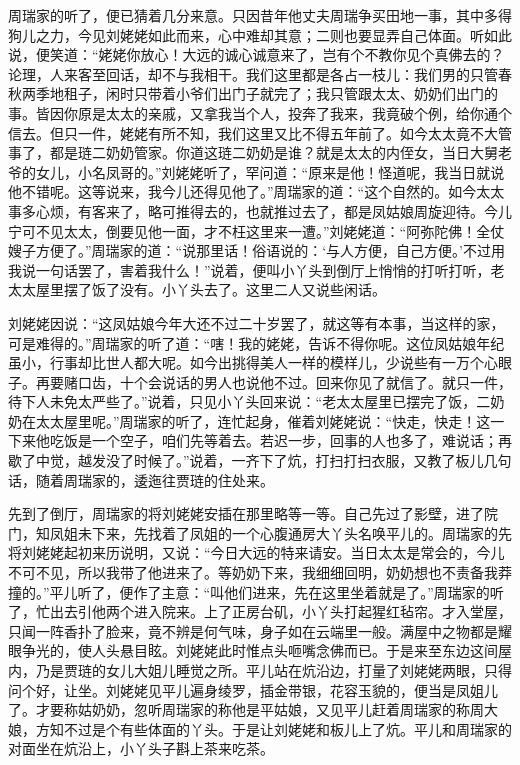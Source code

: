 \documentclass[12pt,oneside]{book}
\begin{document}
周瑞家的听了，便已猜着几分来意。只因昔年他丈夫周瑞争买田地一事，其中多得狗儿之力，今见刘姥姥如此而来，心中难却其意；二则也要显弄自己体面。听如此说，便笑道：“姥姥你放心！大远的诚心诚意来了，岂有个不教你见个真佛去的？论理，人来客至回话，却不与我相干。我们这里都是各占一枝儿：我们男的只管春秋两季地租子，闲时只带着小爷们出门子就完了；我只管跟太太、奶奶们出门的事。皆因你原是太太的亲戚，又拿我当个人，投奔了我来，我竟破个例，给你通个信去。但只一件，姥姥有所不知，我们这里又比不得五年前了。如今太太竟不大管事了，都是琏二奶奶管家。你道这琏二奶奶是谁？就是太太的内侄女，当日大舅老爷的女儿，小名凤哥的。”刘姥姥听了，罕问道：“原来是他！怪道呢，我当日就说他不错呢。这等说来，我今儿还得见他了。”周瑞家的道：“这个自然的。如今太太事多心烦，有客来了，略可推得去的，也就推过去了，都是凤姑娘周旋迎待。今儿宁可不见太太，倒要见他一面，才不枉这里来一遭。”刘姥姥道：“阿弥陀佛！全仗嫂子方便了。”周瑞家的道：“说那里话！俗语说的：‘与人方便，自己方便。’不过用我说一句话罢了，害着我什么！”说着，便叫小丫头到倒厅上悄悄的打听打听，老太太屋里摆了饭了没有。小丫头去了。这里二人又说些闲话。

刘姥姥因说：“这凤姑娘今年大还不过二十岁罢了，就这等有本事，当这样的家，可是难得的。”周瑞家的听了道：“嗐！我的姥姥，告诉不得你呢。这位凤姑娘年纪虽小，行事却比世人都大呢。如今出挑得美人一样的模样儿，少说些有一万个心眼子。再要赌口齿，十个会说话的男人也说他不过。回来你见了就信了。就只一件，待下人未免太严些了。”说着，只见小丫头回来说：“老太太屋里已摆完了饭，二奶奶在太太屋里呢。”周瑞家的听了，连忙起身，催着刘姥姥说：“快走，快走！这一下来他吃饭是一个空子，咱们先等着去。若迟一步，回事的人也多了，难说话；再歇了中觉，越发没了时候了。”说着，一齐下了炕，打扫打扫衣服，又教了板儿几句话，随着周瑞家的，逶迤往贾琏的住处来。

先到了倒厅，周瑞家的将刘姥姥安插在那里略等一等。自己先过了影壁，进了院门，知凤姐未下来，先找着了凤姐的一个心腹通房大丫头名唤平儿的。周瑞家的先将刘姥姥起初来历说明，又说：“今日大远的特来请安。当日太太是常会的，今儿不可不见，所以我带了他进来了。等奶奶下来，我细细回明，奶奶想也不责备我莽撞的。”平儿听了，便作了主意：“叫他们进来，先在这里坐着就是了。”周瑞家的听了，忙出去引他两个进入院来。上了正房台矶，小丫头打起猩红毡帘。才入堂屋，只闻一阵香扑了脸来，竟不辨是何气味，身子如在云端里一般。满屋中之物都是耀眼争光的，使人头悬目眩。刘姥姥此时惟点头咂嘴念佛而已。于是来至东边这间屋内，乃是贾琏的女儿大姐儿睡觉之所。平儿站在炕沿边，打量了刘姥姥两眼，只得问个好，让坐。刘姥姥见平儿遍身绫罗，插金带银，花容玉貌的，便当是凤姐儿了。才要称姑奶奶，忽听周瑞家的称他是平姑娘，又见平儿赶着周瑞家的称周大娘，方知不过是个有些体面的丫头。于是让刘姥姥和板儿上了炕。平儿和周瑞家的对面坐在炕沿上，小丫头子斟上茶来吃茶。
\end{document}

